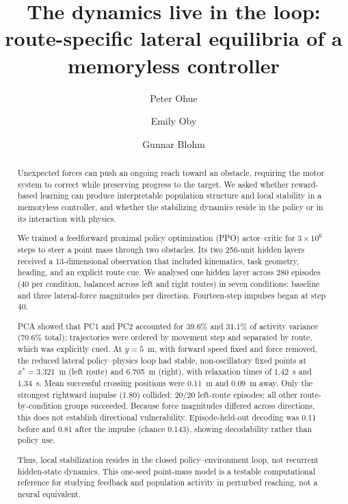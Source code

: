 \documentclass{article}
\title{\textbf{The dynamics live in the loop: route-specific lateral equilibria
of a memoryless controller}}
\author[1]{Peter Ohue}
\author[1]{Emily Oby}
\author[1,2]{Gunnar Blohm}
\affil[1]{Centre for Neuroscience Studies, Queen's University, ON, Canada}
\affil[2]{Department of Biomedical and Molecular Sciences,
          Queen's University, ON, Canada}
\date{}
\begin{document}
\maketitle

\begin{abstract}

Unexpected forces can push an ongoing reach toward an obstacle, requiring
the motor system to correct while preserving progress to the target. We
asked whether reward-based learning can produce interpretable population
structure and local stability in a memoryless controller, and whether the
stabilizing dynamics reside in the policy or in its interaction with physics.

We trained a feedforward proximal policy optimization (PPO) actor--critic
for $3\times10^6$ steps to steer a point mass through two obstacles. Its two
256-unit hidden layers received a 13-dimensional observation that included
kinematics, task geometry, heading, and an explicit route cue. We analysed
one hidden layer across 280 episodes (40 per condition, balanced across
left and right routes) in seven conditions: baseline and three lateral-force
magnitudes per direction. Fourteen-step impulses began at step 40.

PCA showed that PC1 and PC2 accounted for 39.6\% and 31.1\% of activity
variance (70.6\% total); trajectories were ordered by movement step and
separated by route, which was explicitly cued. At $y=5$~m, with forward
speed fixed and force removed, the reduced lateral policy--physics loop had
stable, non-oscillatory fixed points at $x^{*}=3.321$~m (left route) and
6.705~m (right), with relaxation times of 1.42~s and 1.34~s. Mean
successful crossing positions were 0.11~m and 0.09~m away. Only the
strongest rightward impulse (1.80) collided: 20/20 left-route episodes;
all other route-by-condition groups succeeded. Because force magnitudes
differed across directions, this does not establish directional
vulnerability. Episode-held-out decoding was 0.11 before and 0.81 after
the impulse (chance 0.143), showing decodability rather than policy use.

Thus, local stabilization resides in the closed policy--environment loop,
not recurrent hidden-state dynamics. This one-seed point-mass model is a
testable computational reference for studying feedback and population
activity in perturbed reaching, not a neural equivalent.

\end{abstract}
\end{document}
